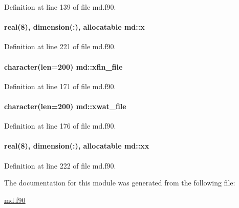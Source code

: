 Definition at line 139 of file md.\-f90.

\hypertarget{classmd_ac6fbffb623e5a2a3e444dcf6a3c99ff3}{
\paragraph[{x}]{\setlength{\rightskip}{0pt plus 5cm}real(8), dimension(\-:), allocatable md\-::x}}\label{classmd_ac6fbffb623e5a2a3e444dcf6a3c99ff3}


Definition at line 221 of file md.\-f90.

\hypertarget{classmd_a175118cc4c2b83f72ff33f63a7614d72}{
\paragraph[{xfin\-\_\-file}]{\setlength{\rightskip}{0pt plus 5cm}character(len=200) md\-::xfin\-\_\-file}}\label{classmd_a175118cc4c2b83f72ff33f63a7614d72}


Definition at line 171 of file md.\-f90.

\hypertarget{classmd_a4d81a7fada60363187e977f833ef08f0}{
\paragraph[{xwat\-\_\-file}]{\setlength{\rightskip}{0pt plus 5cm}character(len=200) md\-::xwat\-\_\-file}}\label{classmd_a4d81a7fada60363187e977f833ef08f0}


Definition at line 176 of file md.\-f90.

\hypertarget{classmd_a9d2b9bed926d39080b64bdf9d4192fc9}{
\paragraph[{xx}]{\setlength{\rightskip}{0pt plus 5cm}real(8), dimension(\-:), allocatable md\-::xx}}\label{classmd_a9d2b9bed926d39080b64bdf9d4192fc9}


Definition at line 222 of file md.\-f90.



The documentation for this module was generated from the following file\-:\begin{DoxyCompactItemize}
\item 
\hyperlink{md_8f90}{md.\-f90}\end{DoxyCompactItemize}
